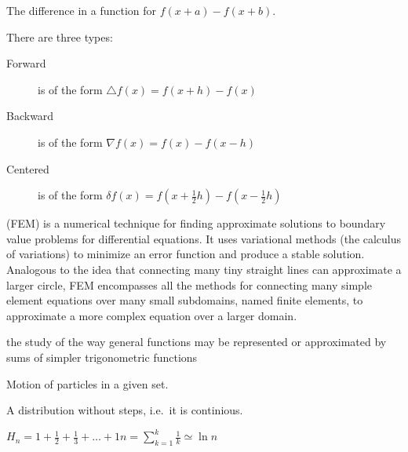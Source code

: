\begin{definition}
    The difference in a function for $f(x + a) - f(x + b)$.

    There are three types:
    \begin{description}
        \item[Forward] is of the form $\bigtriangleup{f}(x) = f(x + h) - f(x)$
        \item[Backward] is of the form $\nabla{f}(x) = f(x) - f(x - h)$
        \item[Centered] is of the form $\delta{f}(x) = f(x + \frac{1}{2}h) - f(x - \frac{1}{2}h)$
    \end{description}
\end{definition}

\begin{definition}
    (FEM) is a numerical technique for finding approximate solutions to
    boundary value problems for differential equations. It uses variational
    methods (the calculus of variations) to minimize an error function and
    produce a stable solution.  Analogous to the idea that connecting many tiny
    straight lines can approximate a larger circle, FEM encompasses all the
    methods for connecting many simple element equations over many small
    subdomains, named finite elements, to approximate a more complex equation
    over a larger domain.

\end{definition}

\begin{definition}

\end{definition}

\begin{definition}
    the study of the way general functions may be represented or approximated
    by sums of simpler trigonometric functions

\end{definition}

\begin{definition}[Flow]
    Motion of particles in a given set.
\end{definition}

\begin{definition}
   A distribution without steps, i.e.\ it is continious. 
\end{definition}

\begin{definition}
    $H_{n} = 1 + \frac{1}{2} + \frac{1}{3} + \dots + {1}{n} =
    {\sum\limits_{k = 1}^{k}} \frac{1}{k} \simeq \ln n$
\end{definition}

